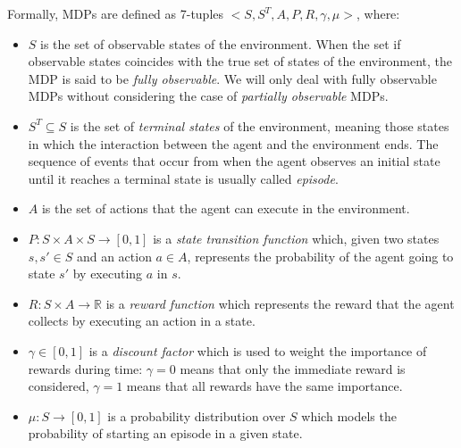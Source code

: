 Formally, MDPs are defined as 7-tuples $<S, S^{T}, A, P, R, \gamma, \mu>$, 
where:
\begin{itemize}
    \item $S$ is the set of observable states of the environment.
    When the set if observable states coincides with the true set of states of 
    the environment, the MDP is said to be \textit{fully observable}. We will 
    only deal with fully observable MDPs without considering the case of 
    \textit{partially observable} MDPs.

    \item $S^{T} \subseteq S$ is the set of \textit{terminal states} of the 
    environment, meaning those states in which the interaction between the agent
    and the environment ends. The sequence of events that occur from when the
    agent observes an initial state until it reaches a terminal state is 
    usually called \textit{episode}.
 
    \item $A$ is the set of actions that the agent can execute in the 
    environment.
 
    \item $P: S \times A \times S \rightarrow [0,1]$ is a \textit{state 
    transition function} which, given two states $s, s' \in S$ and an action 
    $a \in A$, represents the probability of the agent going to state $s'$ by 
    executing $a$ in $s$.
 
    \item $R: S \times A \rightarrow \mathbb{R}$ is a \textit{reward function} 
    which represents the reward that the agent collects by executing an action 
    in a state. 
    
    \item $\gamma \in [0,1]$ is a \textit{discount factor} which is used to 
    weight the importance of rewards during time: $\gamma = 0$ means that only
    the immediate reward is considered, $\gamma = 1$ means that all rewards have
    the same importance.
    
    \item $\mu: S \rightarrow [0, 1]$ is a probability distribution over $S$ 
    which models the probability of starting an episode in a given state.
\end{itemize}
%
